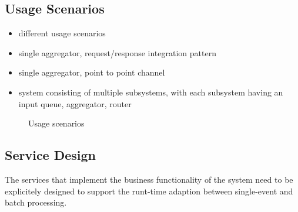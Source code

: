 \subsection{Usage Scenarios}

\begin{itemize}
	\item different usage scenarios
	\item single aggregator, request/response integration pattern
	\item single aggregator, point to point channel
	\item system consisting of multiple subsystems, with each subsystem having an input queue, aggregator, router
\end{itemize}

\begin{landscape}
	\begin{figure*}[htpb]
		\centering
		\mbox{}
		\mbox{}
		\caption{Usage scenarios}
	\end{figure*}
\end{landscape}

\subsection{Service Design}
\label{sec:ch05_service_design}

The services that implement the business functionality of the system need to be explicitely designed to support the runt-time adaption between single-event and batch processing. 

